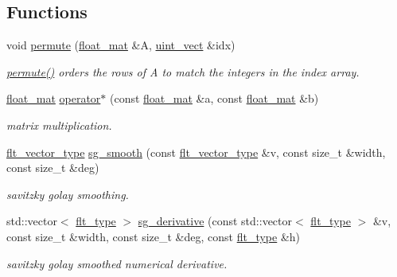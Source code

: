\subsection*{Functions}
\begin{DoxyCompactItemize}
\item 
void \hyperlink{namespaceIceBRG_1_1sgsmooth_a327eec08134fde8d831cdb8d5cc6ef41}{permute} (\hyperlink{classIceBRG_1_1sgsmooth_1_1float__mat}{float\+\_\+mat} \&A, \hyperlink{namespaceIceBRG_1_1sgsmooth_ad7ed0983e4da9c1babc83f2da0a17c51}{uint\+\_\+vect} \&idx)
\begin{DoxyCompactList}\small\item\em \hyperlink{namespaceIceBRG_1_1sgsmooth_a327eec08134fde8d831cdb8d5cc6ef41}{permute()} orders the rows of A to match the integers in the index array. \end{DoxyCompactList}\item 
\hyperlink{classIceBRG_1_1sgsmooth_1_1float__mat}{float\+\_\+mat} \hyperlink{namespaceIceBRG_1_1sgsmooth_aa92e2446e9622897f99011b9e9f3b462}{operator$\ast$} (const \hyperlink{classIceBRG_1_1sgsmooth_1_1float__mat}{float\+\_\+mat} \&a, const \hyperlink{classIceBRG_1_1sgsmooth_1_1float__mat}{float\+\_\+mat} \&b)
\begin{DoxyCompactList}\small\item\em matrix multiplication. \end{DoxyCompactList}\item 
\hyperlink{lib_2IceBRG__main_2common_8h_ab7b04bb475996b18d7653bb03d72f2c6}{flt\+\_\+vector\+\_\+type} \hyperlink{namespaceIceBRG_1_1sgsmooth_aec9a47f68e8ff4d230ef5ddfcaf0db53}{sg\+\_\+smooth} (const \hyperlink{lib_2IceBRG__main_2common_8h_ab7b04bb475996b18d7653bb03d72f2c6}{flt\+\_\+vector\+\_\+type} \&v, const size\+\_\+t \&width, const size\+\_\+t \&deg)
\begin{DoxyCompactList}\small\item\em savitzky golay smoothing. \end{DoxyCompactList}\item 
std\+::vector$<$ \hyperlink{lib_2IceBRG__main_2common_8h_ad0f130a56eeb944d9ef2692ee881ecc4}{flt\+\_\+type} $>$ \hyperlink{namespaceIceBRG_1_1sgsmooth_aab6c3ca9cc4e41ba7474e14cc5b33d6e}{sg\+\_\+derivative} (const std\+::vector$<$ \hyperlink{lib_2IceBRG__main_2common_8h_ad0f130a56eeb944d9ef2692ee881ecc4}{flt\+\_\+type} $>$ \&v, const size\+\_\+t \&width, const size\+\_\+t \&deg, const \hyperlink{lib_2IceBRG__main_2common_8h_ad0f130a56eeb944d9ef2692ee881ecc4}{flt\+\_\+type} \&h)
\begin{DoxyCompactList}\small\item\em savitzky golay smoothed numerical derivative. \end{DoxyCompactList}\item 

\end{DoxyCompactItemize}

